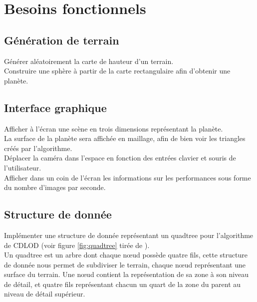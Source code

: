 \documentclass[12pt]{report}
\begin{document}


\section{Besoins fonctionnels}

\subsection{Génération de terrain}

Générer aléatoirement la carte de hauteur d'un terrain.\\
Construire une sphère à partir de la carte rectangulaire afin d'obtenir
une planète.\\


\subsection{Interface graphique}

Afficher à l'écran une scène en trois dimensions représentant la planète.\\
La surface de la planète sera affichée en maillage, afin de bien voir
les triangles créés par l'algorithme.\\
Déplacer la caméra dans l'espace en fonction des entrées clavier et
souris de l'utilisateur.\\
Afficher dans un coin de l'écran les informations sur les performances
sous forme du nombre d'images par seconde.\\

\subsection{Structure de donnée}

Implémenter une structure de donnée représentant un quadtree pour
l'algorithme de CDLOD (voir figure \ref{fig:quadtree} tirée de 
\cite{CDLOD}).\\
Un quadtree est un arbre dont chaque nœud possède quatre fils, cette
structure de donnée nous permet de subdiviser le terrain, chaque nœud
représentant une surface du terrain. Une nœud contient la représentation
de sa zone à son niveau de détail, et quatre fils représentant chacun un
quart de la zone du parent au niveau de détail supérieur.\\
\end{document}

